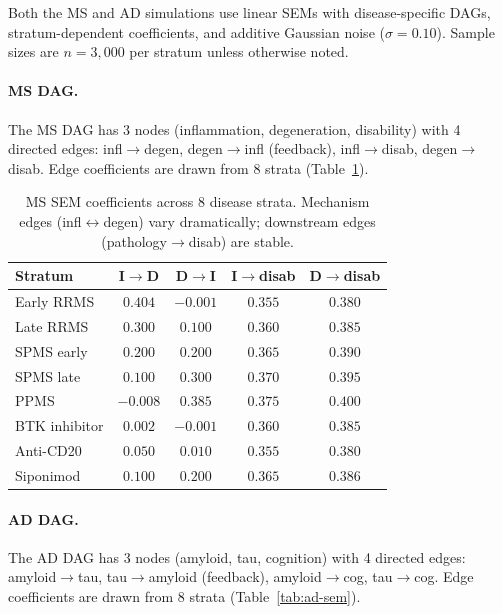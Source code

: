 \documentclass{article}
\begin{document}
Both the MS and AD simulations use linear SEMs with disease-specific DAGs, stratum-dependent coefficients, and additive Gaussian noise ($\sigma = 0.10$). Sample sizes are $n = 3{,}000$ per stratum unless otherwise noted.

\paragraph{MS DAG.}
The MS DAG has 3 nodes (inflammation, degeneration, disability) with 4 directed edges: infl$\to$degen, degen$\to$infl (feedback), infl$\to$disab, degen$\to$disab. Edge coefficients are drawn from 8 strata (Table~\ref{tab:ms-sem}).

\begin{table}[h]
\centering
\caption{MS SEM coefficients across 8 disease strata. Mechanism edges (infl$\leftrightarrow$degen) vary dramatically; downstream edges (pathology$\to$disab) are stable.}
\label{tab:ms-sem}
\small
\begin{tabular}{@{}lcccc@{}}
\toprule
\textbf{Stratum} & \textbf{I$\to$D} & \textbf{D$\to$I} & \textbf{I$\to$disab} & \textbf{D$\to$disab} \\
\midrule
Early RRMS & $0.404$ & $-0.001$ & $0.355$ & $0.380$ \\
Late RRMS & $0.300$ & $0.100$ & $0.360$ & $0.385$ \\
SPMS early & $0.200$ & $0.200$ & $0.365$ & $0.390$ \\
SPMS late & $0.100$ & $0.300$ & $0.370$ & $0.395$ \\
PPMS & $-0.008$ & $0.385$ & $0.375$ & $0.400$ \\
BTK inhibitor & $0.002$ & $-0.001$ & $0.360$ & $0.385$ \\
Anti-CD20 & $0.050$ & $0.010$ & $0.355$ & $0.380$ \\
Siponimod & $0.100$ & $0.200$ & $0.365$ & $0.386$ \\
\bottomrule
\end{tabular}
\end{table}

\paragraph{AD DAG.}
The AD DAG has 3 nodes (amyloid, tau, cognition) with 4 directed edges: amyloid$\to$tau, tau$\to$amyloid (feedback), amyloid$\to$cog, tau$\to$cog. Edge coefficients are drawn from 8 strata (Table~\ref{tab:ad-sem}).
\end{document}
